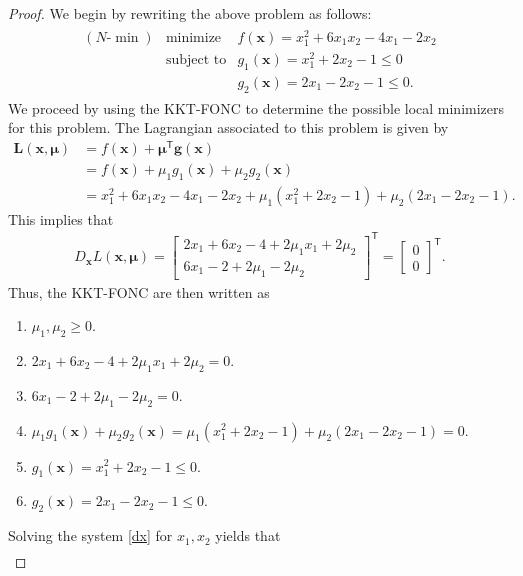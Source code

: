 \documentclass[12pt]{article}
\theoremstyle{definition}
\newcommand{\vc}[1]{\boldsymbol{#1}}
\newcommand{\tran}{\mathsf{T}}
\begin{document}
\begin{proof}
  We begin by rewriting the above problem as follows:
  \begin{align*}
    \begin{array}{rrl}
      (N\text{-}\min) & \text{minimize} & f(\vc{x}) = x_1^2 + 6x_1x_2 -4x_1 -2x_2\\
      & \text{subject to} & g_1(\vc{x}) = x_1^2 + 2x_2 -1 \leq 0\\
      & & g_2(\vc{x}) = 2x_1 -2x_2 - 1 \leq 0.
    \end{array}
  \end{align*}
  We proceed by using the KKT-FONC to determine the possible local minimizers for this problem.
  The Lagrangian associated to this problem is given by
  \begin{align*}
    \vc{L}(\vc{x}, \vc{\mu})
    &= f(\vc{x}) + \vc{\mu}^\tran \vc{g(x)} \\
    &= f(\vc{x}) + \mu_1 g_1(\vc{x}) + \mu_2 g_2(\vc{x}) \\
    &= x_1^2 + 6x_1x_2 -4x_1 -2x_2 + \mu_1(x_1^2 + 2x_2 -1) + \mu_2(2x_1 -2x_2 - 1).
  \end{align*}
  This implies that
  \begin{align}\label{dx}
    D_{\vc{x}}L(\vc{x}, \vc{\mu}) =
    \begin{bmatrix}
      2x_1 + 6x_2 - 4 + 2\mu_1x_1 + 2\mu_2\\
      6x_1 - 2 + 2\mu_1 -2\mu_2
    \end{bmatrix}^\tran
    =
    \begin{bmatrix}
      0 \\
      0
    \end{bmatrix}^\tran.
  \end{align}
  Thus, the KKT-FONC are then written as
  \begin{enumerate}[label=\roman*.]
    \item $\mu_1, \mu_2 \geq 0$.
    \item $2x_1 + 6x_2 - 4 + 2\mu_1x_1 + 2\mu_2 = 0$.
    \item $6x_1 - 2 + 2\mu_1 -2\mu_2 = 0$.
    \item $\mu_1 g_1(\vc{x}) + \mu_2 g_2(\vc{x})  = \mu_1(x_1^2 + 2x_2 -1) + \mu_2(2x_1 -2x_2 - 1) = 0$.
    \item $g_1(\vc{x}) = x_1^2 + 2x_2 -1 \leq 0$.
    \item $g_2(\vc{x}) = 2x_1 -2x_2 - 1 \leq 0$.
  \end{enumerate}
  Solving the system \eqref{dx} for $x_1, x_2$ yields that
  \begin{align}\label{x_def}

\end{align}
\end{proof}
\end{document}
